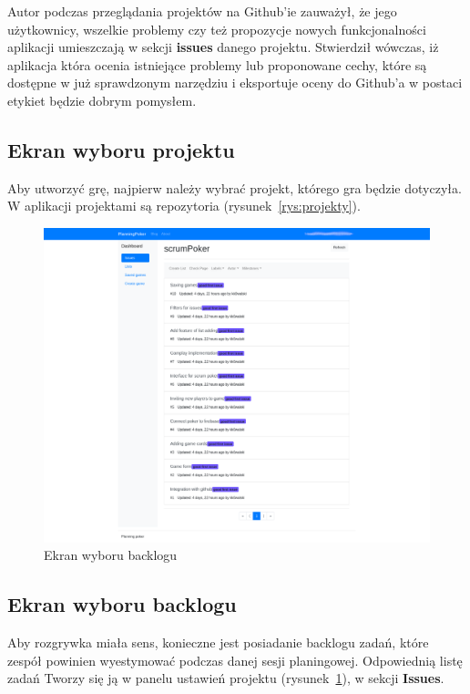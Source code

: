 Autor podczas przeglądania projektów na Github'ie zauważył, że jego użytkownicy,
wszelkie problemy czy też propozycje nowych funkcjonalności aplikacji umieszczają
w sekcji \textbf{issues} danego projektu. Stwierdził wówczas, iż aplikacja która ocenia
istniejące problemy lub proponowane cechy, które są dostępne w już sprawdzonym narzędziu
i eksportuje oceny do Github'a w postaci etykiet będzie dobrym pomysłem.


\subsection{Ekran wyboru projektu}

Aby utworzyć grę, najpierw należy wybrać projekt, którego gra będzie dotyczyła.
W aplikacji projektami są repozytoria (rysunek~\ref{rys:projekty}).

\begin{figure}[h]
	\centering\includegraphics[width=\textwidth]{img/Issues}
	\caption{Ekran wyboru backlogu}\label{rys:issues}%
\end{figure}


\subsection{Ekran wyboru backlogu}

Aby rozgrywka miała sens, konieczne jest posiadanie backlogu zadań,
które zespół powinien wyestymować podczas danej sesji planingowej.
Odpowiednią listę zadań Tworzy się ją w panelu ustawień projektu (rysunek~\ref{rys:issues}),
w sekcji \textbf{Issues}.

